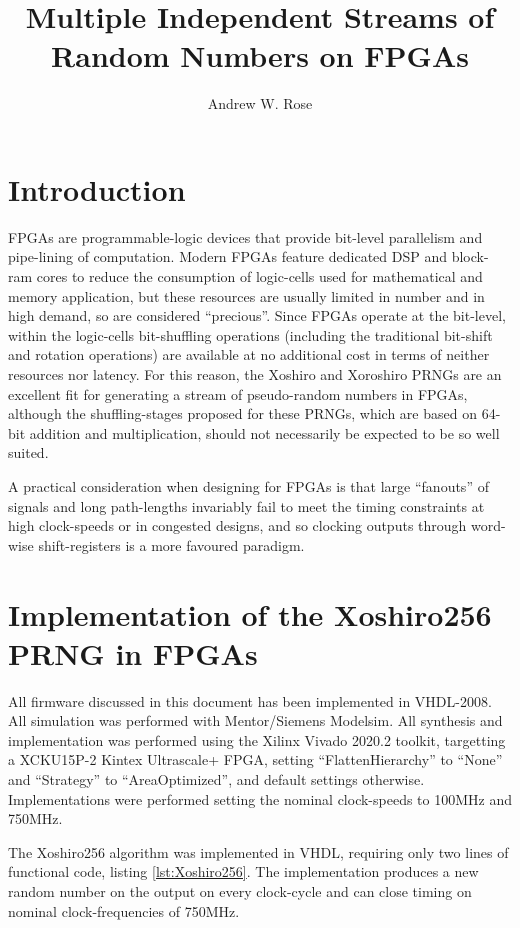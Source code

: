 \documentclass{article}
\title{Multiple Independent Streams of Random Numbers on FPGAs}
\author{Andrew W. Rose}
\begin{document}
\maketitle

\section{Introduction}

FPGAs are programmable-logic devices that provide bit-level parallelism and pipe-lining of computation. Modern FPGAs feature dedicated DSP and block-ram cores to reduce the consumption of logic-cells used for mathematical and memory application, but these resources are usually limited in number and in high demand, so are considered ``precious''. Since FPGAs operate at the bit-level, within the logic-cells bit-shuffling operations (including the traditional bit-shift and rotation operations) are available at no additional cost in terms of neither resources nor latency. For this reason, the Xoshiro and Xoroshiro PRNGs are an excellent fit for generating a stream of pseudo-random numbers in FPGAs, although the shuffling-stages proposed for these PRNGs, which are based on 64-bit addition and multiplication, should not necessarily be expected to be so well suited. 

A practical consideration when designing for FPGAs is that large ``fanouts'' of signals and long path-lengths invariably fail to meet the timing constraints at high clock-speeds or in congested designs, and so clocking outputs through word-wise shift-registers is a more favoured paradigm.

\section{Implementation of the Xoshiro256 PRNG in FPGAs}

All firmware discussed in this document has been implemented in VHDL-2008. All simulation was performed with Mentor/Siemens Modelsim. All synthesis and implementation was performed using the Xilinx Vivado 2020.2 toolkit, targetting a XCKU15P-2 Kintex Ultrascale+ FPGA, setting ``FlattenHierarchy'' to ``None'' and ``Strategy'' to ``AreaOptimized'', and default settings otherwise. Implementations were performed setting the nominal clock-speeds to 100MHz and 750MHz.

The Xoshiro256 algorithm was implemented in VHDL, requiring only two lines of functional code, listing \ref{lst:Xoshiro256}. The implementation produces a new random number on the output on every clock-cycle and can close timing on nominal clock-frequencies of 750MHz.
\end{document}
